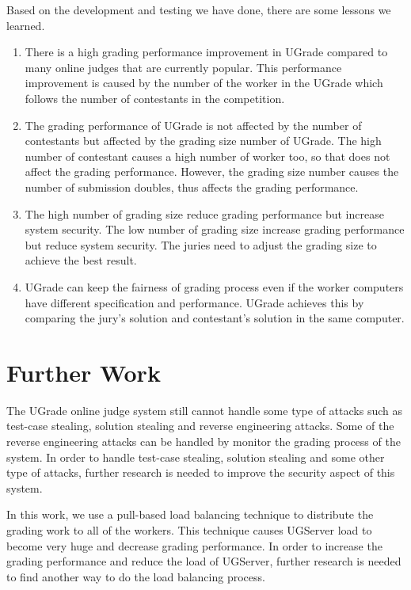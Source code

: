 \documentclass[conference,a4paper]{IEEEtran}
\begin{document}
Based on the development and testing we have done, there are some lessons we learned.
\begin{enumerate}
    \item There is a high grading performance improvement in UGrade compared to many online judges that are currently popular. This performance improvement is caused by the number of the worker in the UGrade which follows the number of contestants in the competition.
    \item The grading performance of UGrade is not affected by the number of contestants but affected by the grading size number of UGrade. The high number of contestant causes a high number of worker too, so that does not affect the grading performance. However, the grading size number causes the number of submission doubles, thus affects the grading performance.
    \item The high number of grading size reduce grading performance but increase system security. The low number of grading size increase grading performance but reduce system security. The juries need to adjust the grading size to achieve the best result.
    \item UGrade can keep the fairness of grading process even if the worker computers have different specification and performance. UGrade achieves this by comparing the jury's solution and contestant's solution in the same computer.
\end{enumerate}

\section{Further Work}

The UGrade online judge system still cannot handle some type of attacks such as test-case stealing, solution stealing and reverse engineering attacks. Some of the reverse engineering attacks can be handled by monitor the grading process of the system. In order to handle test-case stealing, solution stealing and some other type of attacks, further research is needed to improve the security aspect of this system. 

In this work, we use a pull-based load balancing technique to distribute the grading work to all of the workers. This technique causes UGServer load to become very huge and decrease grading performance. In order to increase the grading performance and reduce the load of UGServer, further research is needed to find another way to do the load balancing process.
\end{document}
